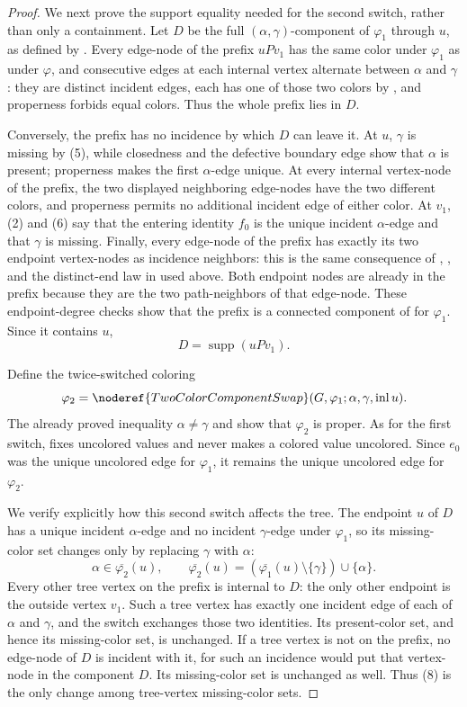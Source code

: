 \begin{proof}
We next prove the support equality needed for the second switch, rather
than only a containment.  Let $D$ be the full
$(\alpha,\gamma)$-component of $\varphi_1$ through $u$, as defined by
.  Every edge-node of the prefix $uPv_1$ has
the same color under $\varphi_1$ as under $\varphi$, and consecutive
edges at each internal vertex alternate between $\alpha$ and $\gamma$:
they are distinct incident edges, each has one of those two colors by
, and properness forbids equal colors.
Thus the whole prefix lies in $D$.

Conversely, the prefix has no incidence by which $D$ can leave it.  At
$u$, $\gamma$ is missing by (5), while closedness and the defective
boundary edge show that $\alpha$ is present; properness makes the first
$\alpha$-edge unique.  At every internal vertex-node of the prefix, the
two displayed neighboring edge-nodes have the two different colors, and
properness permits no additional incident edge of either color.  At
$v_1$, (2) and (6) say that the entering identity $f_0$ is the unique
incident $\alpha$-edge and that $\gamma$ is missing.  Finally, every
edge-node of the prefix has exactly its two endpoint vertex-nodes as
incidence neighbors: this is the same consequence of
, , and the distinct-end
law in  used above.  Both endpoint nodes are
already in the prefix because they are the two path-neighbors of that
edge-node.  These endpoint-degree checks show that the prefix is a
connected component of
 for $\varphi_1$.  Since it contains $u$,
\[
 D=\operatorname{supp}(uPv_1). \tag{7}
\]

Define the twice-switched coloring
\[
 \varphi_2=\noderef{TwoColorComponentSwap}
   (G,\varphi_1;\alpha,\gamma,\operatorname{inl}u).
\]
The already proved inequality $\alpha\ne\gamma$ and
 show that $\varphi_2$ is proper.
As for the first switch,  fixes uncolored
values and never makes a colored value uncolored.  Since $e_0$ was the
unique uncolored edge for $\varphi_1$, it remains the unique uncolored
edge for $\varphi_2$.

We verify explicitly how this second switch affects the tree.  The
endpoint $u$ of $D$ has a unique incident $\alpha$-edge and no incident
$\gamma$-edge under $\varphi_1$, so its missing-color set changes only by
replacing $\gamma$ with $\alpha$:
\[
 \alpha\in\overline{\varphi_2}(u),\qquad
 \overline{\varphi_2}(u)
   =(\overline{\varphi_1}(u)\setminus\{\gamma\})\cup\{\alpha\}. \tag{8}
\]
Every other tree vertex on the prefix is internal to $D$: the only other
endpoint is the outside vertex $v_1$.  Such a tree vertex has exactly one
incident edge of each of $\alpha$ and $\gamma$, and the switch exchanges
those two identities.  Its present-color set, and hence its missing-color
set, is unchanged.  If a tree vertex is not on the prefix, no edge-node
of $D$ is incident with it, for such an incidence would put that
vertex-node in the component $D$.  Its missing-color set is unchanged as
well.  Thus (8) is the only change among tree-vertex missing-color sets.


\end{proof}
